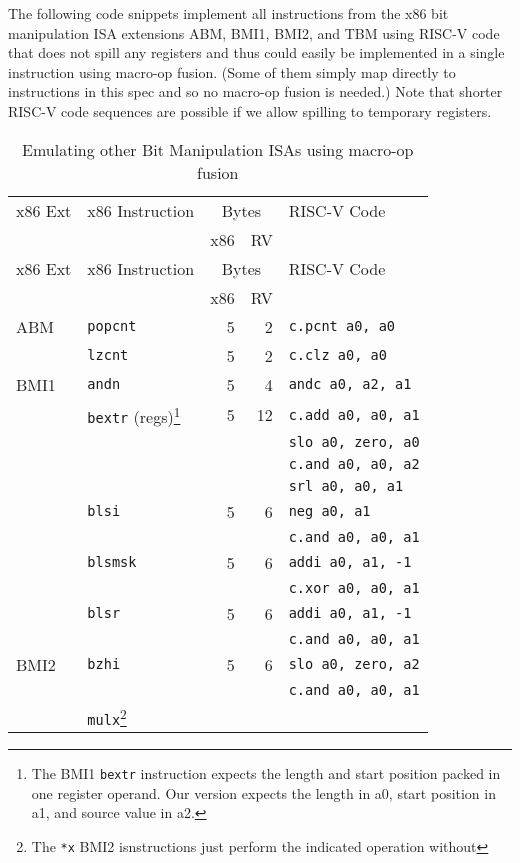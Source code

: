 The following code snippets implement all instructions from the x86 bit manipulation
ISA extensions ABM, BMI1, BMI2, and TBM using RISC-V code that does not spill any
registers and thus could easily be implemented in a single instruction using macro-op
fusion. (Some of them simply map directly to instructions in this spec and so no
macro-op fusion is needed.) Note that shorter RISC-V code sequences are possible if
we allow spilling to temporary registers.

\begin{longtable}[c]{@{}llrrl@{}}
\caption{Emulating other Bit Manipulation ISAs using macro-op fusion}\tabularnewline
\toprule
x86 Ext & x86 Instruction & \multicolumn{2}{c}{Bytes} & RISC-V Code\tabularnewline
        &                 & x86 & RV            &\tabularnewline
\midrule
\endfirsthead
\toprule
x86 Ext & x86 Instruction & \multicolumn{2}{c}{Bytes} & RISC-V Code\tabularnewline
        &                 & x86 & RV            &\tabularnewline
\midrule
\endhead
ABM  & {\tt popcnt}           & 5 &  2 & {\tt c.pcnt a0, a0}\tabularnewline
\cline{2-5}
     & {\tt lzcnt}            & 5 &  2 & {\tt c.clz a0, a0}\tabularnewline
\midrule
BMI1 & {\tt andn}             & 5 &  4 & {\tt andc a0, a2, a1}\tabularnewline
\cline{2-5}
     & {\tt bextr} (regs)\footnote{
         The BMI1 {\tt bextr} instruction expects the length and start position packed in one
	 register operand. Our version expects the length in a0, start position in a1, and source
	 value in a2.
                            } & 5 & 12 & {\tt c.add a0, a0, a1}\tabularnewline
     &                        &   &    & {\tt slo a0, zero, a0}\tabularnewline
     &                        &   &    & {\tt c.and a0, a0, a2}\tabularnewline
     &                        &   &    & {\tt srl a0, a0, a1}\tabularnewline
\cline{2-5}
     & {\tt blsi}             & 5 &  6 & {\tt neg a0, a1}\tabularnewline
     &                        &   &    & {\tt c.and a0, a0, a1}\tabularnewline
\cline{2-5}
     & {\tt blsmsk}           & 5 &  6 & {\tt addi a0, a1, -1}\tabularnewline
     &                        &   &    & {\tt c.xor a0, a0, a1}\tabularnewline
\cline{2-5}
     & {\tt blsr}             & 5 &  6 & {\tt addi a0, a1, -1}\tabularnewline
     &                        &   &    & {\tt c.and a0, a0, a1}\tabularnewline
\midrule
BMI2 & {\tt bzhi}             & 5 &  6 & {\tt slo a0, zero, a2}\tabularnewline
     &                        &   &    & {\tt c.and a0, a0, a1}\tabularnewline
\cline{2-5}
     & {\tt mulx}\footnote{
         The \texttt{*x} BMI2 isnstructions just perform the indicated operation without
}
\end{longtable}
